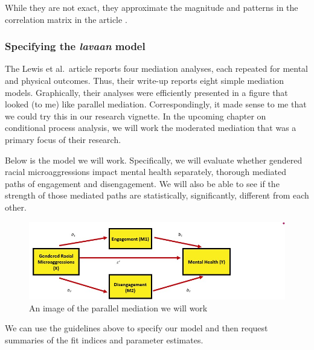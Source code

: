 \documentclass[
  11pt,
]{book}
\begin{document}
While they are not exact, they approximate the magnitude and patterns in the correlation matrix in the article \citep{lewis_applying_2017}.

\hypertarget{specifying-the-lavaan-model}{%
\subsubsection{\texorpdfstring{Specifying the \emph{lavaan} model}{Specifying the lavaan model}}\label{specifying-the-lavaan-model}}

The Lewis et al.~article \citeyearpar{lewis_applying_2017} reports four mediation analyses, each repeated for mental and physical outcomes. Thus, their write-up reports eight simple mediation models. Graphically, their analyses were efficiently presented in a figure that looked (to me) like parallel mediation. Correspondingly, it made sense to me that we could try this in our research vignette. In the upcoming chapter on conditional process analysis, we will work the moderated mediation that was a primary focus of their research.

Below is the model we will work. Specifically, we will evaluate whether gendered racial microaggressions impact mental health separately, thorough mediated paths of engagement and disengagement. We will also be able to see if the strength of those mediated paths are statistically, significantly, different from each other.

\begin{figure}
\centering
\includegraphics{images/CompMed/LewisParaMed.jpg}
\caption{An image of the parallel mediation we will work}
\end{figure}

We can use the guidelines above to specify our model and then request summaries of the fit indices and parameter estimates.
\end{document}
